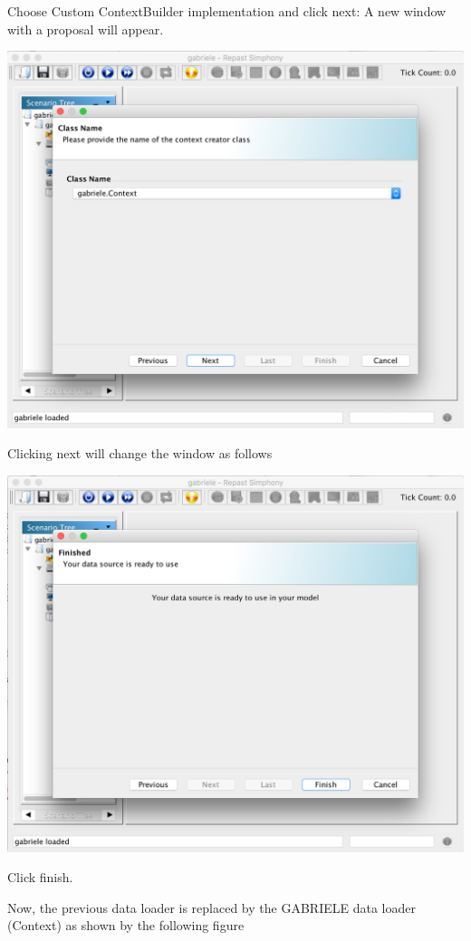 \documentclass{book}
\begin{document}
Choose Custom ContextBuilder implementation and click next:
A new window with a proposal will appear. 

\noindent
\includegraphics[scale=0.35]{fig_gabriele_rs_gui4}

Clicking next will change the window as follows 

\noindent
\includegraphics[scale=0.35]{fig_gabriele_rs_gui5}

Click finish.

Now, the previous data loader is replaced by the GABRIELE data loader (Context) as shown by the following figure
\end{document}
